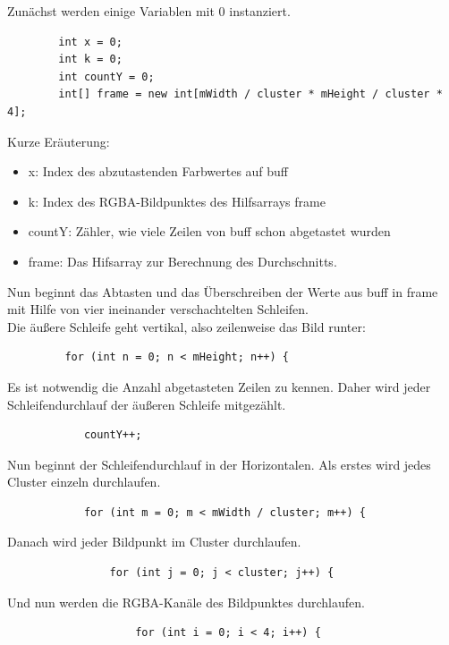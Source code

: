 \begin{description}
Zunächst werden einige Variablen mit \textcolor{blau}{0} instanziert.
\begin{lstlisting}
        int x = 0;
        int k = 0;                                                                                  
        int countY = 0;                                                                             
        int[] frame = new int[mWidth / cluster * mHeight / cluster * 4];                            
\end{lstlisting}
Kurze Eräuterung:
\begin{itemize}
\item x: Index des abzutastenden Farbwertes auf buff
\item k: Index des RGBA-Bildpunktes des Hilfsarrays frame
\item countY: Zähler, wie viele Zeilen von buff schon abgetastet wurden
\item frame: Das Hifsarray zur Berechnung des Durchschnitts.   
\end{itemize}
Nun beginnt das Abtasten und das Überschreiben der Werte aus buff in frame mit Hilfe von vier ineinander verschachtelten Schleifen.\\
Die äußere Schleife geht vertikal, also zeilenweise das Bild runter:
\begin{lstlisting}
         for (int n = 0; n < mHeight; n++) {                                                         
\end{lstlisting}
Es ist notwendig die Anzahl abgetasteten Zeilen zu kennen. Daher wird jeder Schleifendurchlauf der äußeren Schleife mitgezählt.
\begin{lstlisting}
            countY++;                                                                               
\end{lstlisting}
Nun beginnt der Schleifendurchlauf in der Horizontalen. Als erstes wird jedes Cluster einzeln durchlaufen.
\begin{lstlisting}
            for (int m = 0; m < mWidth / cluster; m++) {                                            
\end{lstlisting}
Danach wird jeder Bildpunkt im Cluster durchlaufen.
\begin{lstlisting}            
                for (int j = 0; j < cluster; j++) {                                                 
\end{lstlisting}
Und nun werden die RGBA-Kanäle des Bildpunktes durchlaufen. 
\begin{lstlisting}
                    for (int i = 0; i < 4; i++) {                                                   

\end{lstlisting}
\end{description}
